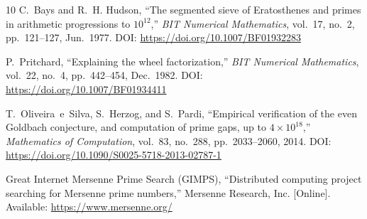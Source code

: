 \documentclass[12pt]{article}
\begin{document}
\begin{thebibliography}{10}
C.~Bays and R.~H. Hudson,
``The segmented sieve of Eratosthenes and primes in arithmetic progressions
to $10^{12}$,''
\textit{BIT Numerical Mathematics}, vol.~17, no.~2, pp.~121--127, Jun.~1977.
DOI: \url{https://doi.org/10.1007/BF01932283}

P.~Pritchard,
``Explaining the wheel factorization,''
\textit{BIT Numerical Mathematics}, vol.~22, no.~4, pp.~442--454, Dec.~1982.
DOI: \url{https://doi.org/10.1007/BF01934411}

T.~Oliveira~e~Silva, S.~Herzog, and S.~Pardi,
``Empirical verification of the even Goldbach conjecture, and computation of
prime gaps, up to $4 \times 10^{18}$,''
\textit{Mathematics of Computation}, vol.~83, no.~288, pp.~2033--2060, 2014.
DOI: \url{https://doi.org/10.1090/S0025-5718-2013-02787-1}


Great Internet Mersenne Prime Search (GIMPS),
``Distributed computing project searching for Mersenne prime numbers,''
Mersenne Research, Inc.
[Online]. Available: \url{https://www.mersenne.org/}

\end{thebibliography}
\end{document}
